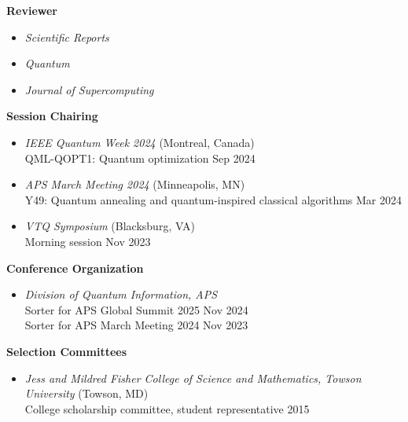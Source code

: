 \documentclass[marginmode, 10pt]{res} %
\begin{document}
\begin{resume}
\textbf{Reviewer}
\begin{itemize}
    \item \textit{Scientific Reports}
    \item \textit{Quantum}
    \item \textit{Journal of Supercomputing}
\end{itemize}

\textbf{Session Chairing}
\begin{itemize}
    \item \textit{IEEE Quantum Week 2024} (Montreal, Canada) \\
    QML-QOPT1: Quantum optimization \hfill Sep 2024
    \item \textit{APS March Meeting 2024} (Minneapolis, MN) \\
    Y49: Quantum annealing and quantum-inspired classical algorithms \hfill Mar 2024
    \item \textit{VTQ Symposium} (Blacksburg, VA) \\
    Morning session \hfill Nov 2023
\end{itemize}

\textbf{Conference Organization}
\begin{itemize}
    \item \textit{Division of Quantum Information, APS} \\
    Sorter for APS Global Summit 2025 \hfill Nov 2024 \\
    Sorter for APS March Meeting 2024 \hfill Nov 2023
\end{itemize}

\textbf{Selection Committees}
\begin{itemize}
    \item \textit{Jess and Mildred Fisher College of Science and Mathematics, Towson University} (Towson, MD) \\
    College scholarship committee, student representative \hfill 2015
\end{itemize}


\end{resume}
\end{document}
